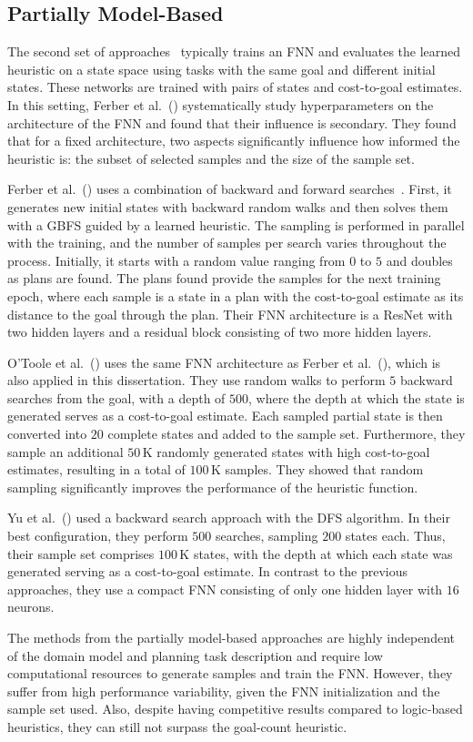 \subsection{Partially Model-Based}

The second set of approaches~\cite{Ferber.etal/2020a, Yu.etal/2020, Ferber.etal/2022, OToole/2022} typically trains an FNN and evaluates the learned heuristic on a state space using tasks with the same goal and different initial states. These networks are trained with pairs of states and cost-to-goal estimates. In this setting, Ferber et al.~(\citeyear{Ferber.etal/2020a}) systematically study hyperparameters on the architecture of the FNN and found that their influence is secondary. They found that for a fixed architecture, two aspects significantly influence how informed the heuristic is: the subset of selected samples and the size of the sample set. 

Ferber et al.~(\citeyear{Ferber.etal/2022}) uses a combination of backward and forward searches~\cite{Arfaee.etal/2011}. First, it generates new initial states with backward random walks and then solves them with a GBFS guided by a learned heuristic. The sampling is performed in parallel with the training, and the number of samples per search varies throughout the process. Initially, it starts with a random value ranging from $0$ to $5$ and doubles as plans are found. The plans found provide the samples for the next training epoch, where each sample is a state in a plan with the cost-to-goal estimate as its distance to the goal through the plan. Their FNN architecture is a ResNet with two hidden layers and a residual block consisting of two more hidden layers.

O'Toole et al.~(\citeyear{OToole/2022}) uses the same FNN architecture as Ferber et al.~(\citeyear{Ferber.etal/2022}), which is also applied in this dissertation. They use random walks to perform $5$ backward searches from the goal, with a depth of $500$, where the depth at which the state is generated serves as a cost-to-goal estimate. Each sampled partial state is then converted into $20$ complete states and added to the sample set. Furthermore, they sample an additional $50$\,K randomly generated states with high cost-to-goal estimates, resulting in a total of $100$\,K samples. They showed that random sampling significantly improves the performance of the heuristic function.

Yu et al.~(\citeyear{Yu.etal/2020}) used a backward search approach with the DFS algorithm. In their best configuration, they perform $500$ searches, sampling $200$ states each. Thus, their sample set comprises $100$\,K states, with the depth at which each state was generated serving as a cost-to-goal estimate. In contrast to the previous approaches, they use a compact FNN consisting of only one hidden layer with $16$ neurons.

The methods from the partially model-based approaches are highly independent of the domain model and planning task description and require low computational resources to generate samples and train the FNN. However, they suffer from high performance variability, given the FNN initialization and the sample set used. Also, despite having competitive results compared to logic-based heuristics, they can still not surpass the goal-count heuristic.
